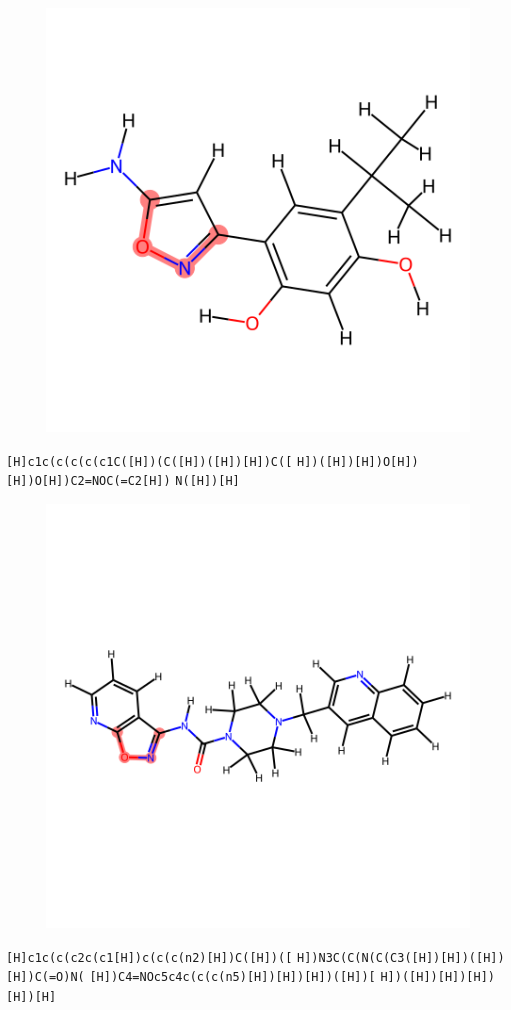 \documentclass{article}
\begin{document}
\begin{figure}[ht]
\centering
    \includegraphics{mol260.png}
\end{figure}
\verb|[H]c1c(c(c(c(c1C([H])(C([H])([H])[H])C([| \verb|H])([H])[H])O[H])[H])O[H])C2=NOC(=C2[H])| \verb|N([H])[H]|

\begin{figure}[ht]
\centering
    \includegraphics{mol261.png}
\end{figure}
\verb|[H]c1c(c(c2c(c1[H])c(c(c(n2)[H])C([H])([| \verb|H])N3C(C(N(C(C3([H])[H])([H])[H])C(=O)N(| \verb|[H])C4=NOc5c4c(c(c(n5)[H])[H])[H])([H])[| \verb|H])([H])[H])[H])[H])[H]|
\end{document}
